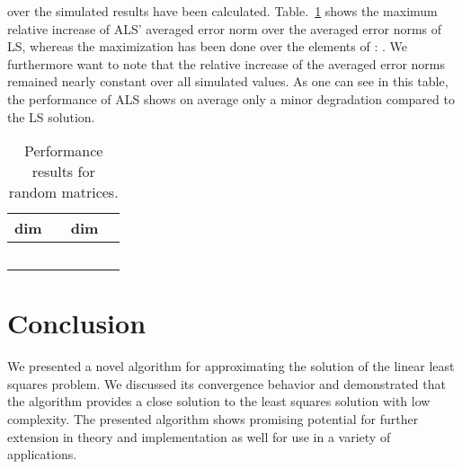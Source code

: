 \documentclass{article}
\begin{document}
over the simulated results have been calculated.
Table.~\ref{tab:perf_res} shows the maximum relative increase of ALS'
averaged error norm over the averaged error norms of LS, whereas the maximization
has been done over the elements of : 
. 
We furthermore want to note that 
the relative increase of the averaged
error norms remained nearly constant over all simulated  values.
As one can see in this table, the performance of ALS shows on average only a minor degradation 
compared to the LS solution.
\begin{table}[htb]
\centering
\begin{tabular}{|l|c||l|c|}
\hline
dim &  & dim &  \\
\hline
   &   &    &  \\
   &   &    &  \\
   &  &    & \\
   &  &    & \\
  &    &   & \\    
\hline
\end{tabular}
\caption{Performance results for random matrices. \label{tab:perf_res} }
\end{table}
\section{Conclusion} \label{sec:sim_res}
We presented a novel algorithm for 
approximating the solution of the linear least squares problem. We discussed its 
convergence behavior and
demonstrated that the algorithm provides a close solution to the least squares solution
with low complexity. The presented algorithm 
shows promising potential for further extension in theory and implementation as well 
for use in a variety of applications.


\vfill\pagebreak
\end{document}
